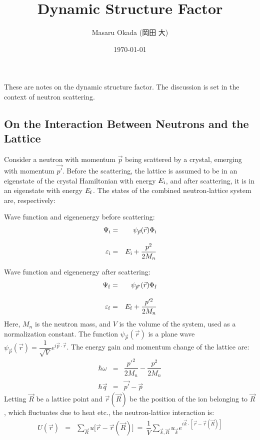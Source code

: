 \documentclass[a4j]{jsarticle}
\title{
Dynamic Structure Factor
}
\author{Masaru Okada (岡田 大)}
\date{\today}
\begin{document}
\maketitle

These are notes on the dynamic structure factor. The discussion is set in the context of neutron scattering.

\subsection*{On the Interaction Between Neutrons and the Lattice}

Consider a neutron with momentum $\vec{p}$ being scattered by a crystal, emerging with momentum $\vec{p'}$.
Before the scattering, the lattice is assumed to be in an eigenstate of the crystal Hamiltonian with energy $E_{\rm i}$, and after scattering, it is in an eigenstate with energy $E_{\rm f}$.
The states of the combined neutron-lattice system are, respectively:

\hspace{5mm}
Wave function and eigenenergy before scattering:
\begin{eqnarray}
	\Psi_{\rm i}
	&=&
	\psi_{\vec{p}}(\vec{r}) \Phi_{\rm i}
	\\[3mm]
	\varepsilon_{\rm i}
	&=&
	E_{\rm i} + \dfrac{p^{2}}{2 M_{n}}
\end{eqnarray}

\hspace{5mm}
Wave function and eigenenergy after scattering:
\begin{eqnarray}
	\Psi_{\rm f}
	&=&
	\psi_{\vec{p}'}(\vec{r}) \Phi_{\rm f}
	\\[3mm]
	\varepsilon_{\rm f}
	&=&
	E_{\rm f} + \dfrac{p'^{2}}{2 M_{n}}
\end{eqnarray}
Here, $M_{n}$ is the neutron mass, and
$V$ is the volume of the system, used as a normalization constant.
The function $\psi_{\vec{p}}(\vec{r})$ is a plane wave
$
	\psi_{\vec{p}}(\vec{r}) = \dfrac{1}{\sqrt{V}} e^{i \vec{p} \cdot \vec{r}}
$.
The energy gain and momentum change of the lattice are:
\begin{eqnarray}
	\hbar \omega
	&=&
	\dfrac{p'^{2}}{2 M_{n}}
	-
	\dfrac{p^{2}}{2 M_{n}}
	\\[2mm]
	\hbar \vec{q}
	&=&
	\vec{p'}
	-
	\vec{p}
\end{eqnarray}
Letting $\vec{R}$ be a lattice point and $\vec{r}(\vec{R})$ be the position of the ion belonging to $\vec{R}$, which fluctuates due to heat etc., the neutron-lattice interaction is:
\begin{eqnarray}
	U(\vec{r})
	&=&
	\sum_{\vec{R}}
	u \big[ \vec{r} - \vec{r}(\vec{R}) \big]
	\ = \
	\dfrac{1}{V}
	\sum_{\vec{k},\vec{R}}
	u_{\vec{k}} e^{i \vec{k} \cdot [ \vec{r} - \vec{r}(\vec{R}) ]}
\end{eqnarray}
\end{document}
